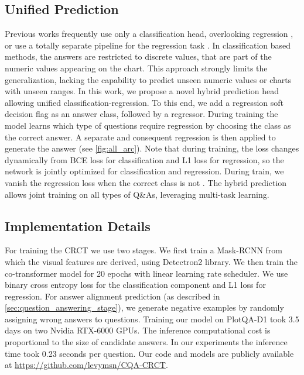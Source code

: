 \documentclass[runningheads]{llncs}
\newcommand\our[1][]{CRCT\xspace}
\begin{document}
\subsection{Unified Prediction}
\label{sec:hybrid_prediction}
Previous works frequently use only a classification head, overlooking regression \cite{figureqa,dvqa,chaudhry2019leafqa,chartqa}, or use a totally separate pipeline for the regression task \cite{plotqa}. In classification based methods, the answers are restricted to discrete values, that are part of the numeric values appearing on the chart. This approach strongly limits the generalization, lacking the capability to predict unseen numeric values or charts with unseen ranges. 
In this work, we propose a novel hybrid prediction head allowing unified classification-regression. To this end, we add a regression soft decision flag  as an answer class, followed by a regressor. During training the model learns which type of questions require regression by choosing the  class as the correct answer. A separate and consequent regression is then applied to generate the answer (see \cref{fig:all_arc}). Note that during training, the loss changes dynamically from BCE loss for classification and L1 loss for regression, so the network is jointly optimized for classification and regression. During train, we vanish the regression loss when the correct class is not . The hybrid prediction allows joint training on all types of Q\&As, leveraging multi-task learning. 

\subsection{Implementation Details}
For training the \our we use two stages. We first train a Mask-RCNN \cite{he2017mask} from which the visual features are derived, using Detectron2 \cite{wu2019detectron2} library. We then train the co-transformer model for 20 epochs with linear learning rate scheduler. We use binary cross entropy loss for the classification component and L1 loss for regression. For answer alignment prediction (as described in \cref{sec:question_answering_stage}), we generate negative examples by randomly assigning wrong answers to questions. Training our model on PlotQA-D1 took 3.5 days on two Nvidia RTX-6000 GPUs. The inference computational cost is proportional to the size of candidate answers. In our experiments the inference time took 0.23 seconds per question. Our code and models are publicly available at \href{https://github.com/levymsn/CQA-CRCT}{https://github.com/levymsn/CQA-CRCT}.
\end{document}
